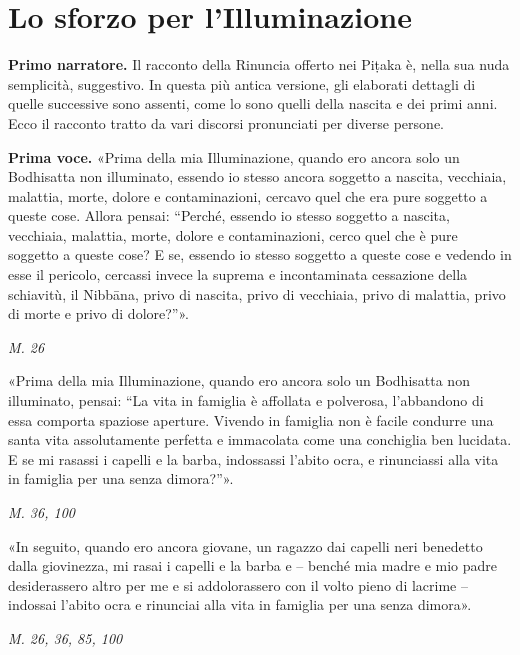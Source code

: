 \chapter{Lo sforzo per l'Illuminazione}

\textbf{Primo narratore.} Il racconto della Rinuncia offerto nei Piṭaka è, nella
sua nuda semplicità, suggestivo. In questa più antica versione, gli
elaborati dettagli di quelle successive sono assenti, come lo sono
quelli della nascita e dei primi anni. Ecco il racconto tratto da vari
discorsi pronunciati per diverse persone.


\textbf{Prima voce.} «Prima della mia Illuminazione, quando ero ancora solo un
Bodhisatta non illuminato, essendo io stesso ancora soggetto a nascita,
vecchiaia, malattia, morte, dolore e contaminazioni, cercavo quel che
era pure soggetto a queste cose. Allora pensai: “Perché, essendo io
stesso soggetto a nascita, vecchiaia, malattia, morte, dolore e
contaminazioni, cerco quel che è pure soggetto a queste cose? E se,
essendo io stesso soggetto a queste cose e vedendo in esse il pericolo,
cercassi invece la suprema e incontaminata cessazione della schiavitù,
il Nibbāna, privo di nascita, privo di vecchiaia, privo di malattia,
privo di morte e privo di dolore?”».


\emph{M. 26}


«Prima della mia Illuminazione, quando ero ancora solo un Bodhisatta non
illuminato, pensai: “La vita in famiglia è affollata e polverosa,
l’abbandono di essa comporta spaziose aperture. Vivendo in famiglia non
è facile condurre una santa vita assolutamente perfetta e immacolata
come una conchiglia ben lucidata. E se mi rasassi i capelli e la barba,
indossassi l’abito ocra, e rinunciassi alla vita in famiglia per una
senza dimora?”».


\emph{M. 36, 100}


«In seguito, quando ero ancora giovane, un ragazzo dai capelli neri
benedetto dalla giovinezza, mi rasai i capelli e la barba e – benché mia
madre e mio padre desiderassero altro per me e si addolorassero con il
volto pieno di lacrime – indossai l’abito ocra e rinunciai alla vita in
famiglia per una senza dimora».


\emph{M. 26, 36, 85, 100}


